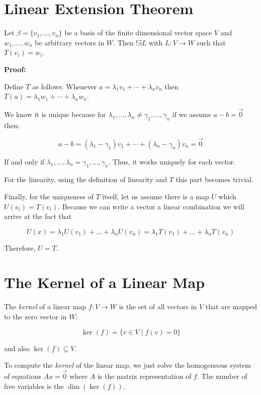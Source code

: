 \section{Linear Extension Theorem}

Let \(\beta = \{v_1, \dots, v_n\}\) be a basis of the finite dimensional vector space \(V\) and 
\(w_1, \dots, w_n\) be arbitrary vectors in \(W\). Then \(!\exists L\) with \(L : V \to W\) such 
that \(T(v_i) = w_i\).

\textbf{Proof:}

Define \(T\) as follows: Whenever \(a = \lambda_1 v_1 + \cdots + \lambda_n v_n\) then 
\(T(a) = \lambda_1 w_1 + \cdots + \lambda_n w_n\).

We know it is unique because for
\(\lambda_1, \dots, \lambda_n \ne \gamma_1, \dots, \gamma_n\) if we assume \(a - b = \vec{0}\) then:

\[
    a - b = (\lambda_1  - \gamma_1) v_1 + \cdots + (\lambda_n - \gamma_n) v_n = \vec{0}
\]

If and only if \(\lambda_1, \dots, \lambda_n = \gamma_1, \dots, \gamma_n\). Thus, it works uniquely 
for each vector.
    
For the linearity, using the definition of linearity and \(T\) this part becomes trivial.

Finally, for the uniqueness of \(T\) itself, let us assume there is a map \(U\) which 
\(U(v_i) = T(v_i)\). Because we can write a vector a linear combination we will arrive at the 
fact that 

\[
    U(x) = \lambda_1U(v_1) + \dots + \lambda_n U(v_n) =  \lambda_1T(v_1) + \dots + \lambda_n T(v_n) 
\]

Therefore, \(U = T\).

\QED

\section{The Kernel of a Linear Map}

The \emph{kernel} of a linear map \( f: V \to W \) is the set of all vectors in \( V \) that are mapped to 
the zero vector in \( W \):

\[
    \ker(f) = \{ v \in V \mid f(v) = 0 \}
\]

and also \(\ker(f) \subseteq V\). 

To compute the \emph{kernel} of the linear map, we just solve the homogeneous system of equations \(Ax = \vec{0}\) 
where \(A\) is the matrix representation of \(f\). The number of free variables is the \(\dim(\ker(f))\).

